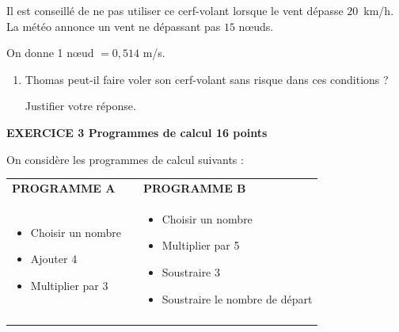 \documentclass[11pt]{article}
\begin{document}
Il est conseillé de ne pas utiliser ce cerf-volant lorsque le vent dépasse $20$~km/h. La météo annonce un vent ne dépassant pas $15$ nœuds.

On donne 1 nœud $= 0,514$ m/s.

\begin{enumerate}[start=3]
\item Thomas peut-il faire voler son cerf-volant sans risque dans ces conditions ?

Justifier votre réponse.
\end{enumerate}

\newpage

\textbf{EXERCICE 3 Programmes de calcul \hfill 16 points}

\medskip

On considère les programmes de calcul suivants :

\begin{center}
\begin{tabularx}{\linewidth}{|>{\centering \arraybackslash}X|c |>{\centering \arraybackslash}X|}\cline{1-1}\cline{3-3}
\textbf{PROGRAMME A}&&\textbf{PROGRAMME B}\\
\begin{itemize}[label=$\bullet~$]
\item Choisir un nombre
\item Ajouter 4
\item Multiplier par 3
\end{itemize}&&
\begin{itemize}[label=$\bullet~$]
\item Choisir un nombre 
\item Multiplier par 5
\item Soustraire 3
\item Soustraire le nombre de départ
\end{itemize}\\ \cline{1-1}\cline{3-3}
\end{tabularx}
\end{center}
\end{document}
